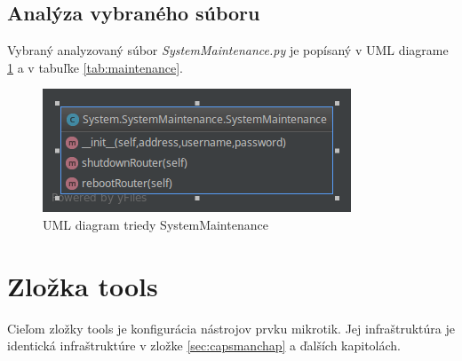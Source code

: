 \subsection{Analýza vybraného súboru}
Vybraný analyzovaný súbor \textit{SystemMaintenance.py} je popísaný v UML diagrame \ref{fig:systemMaintenance} a v tabuľke \ref{tab:maintenance}.
\begin{table}[H]
\centering
{}
\caption{Tabuľka metód triedy SystemMaintenance}
\label{tab:maintenance}
\end{table}
\begin{figure}[H]
\centering
\includegraphics[scale=0.6]{../text/SystemMaintenance.png}
\caption{UML diagram triedy SystemMaintenance}
\label{fig:systemMaintenance}
\end{figure}
\section{Zložka tools}
Cieľom zložky tools je konfigurácia nástrojov prvku mikrotik. Jej infraštruktúra je identická infraštruktúre v zložke \ref{sec:capsmanchap} a ďalších kapitolách.
